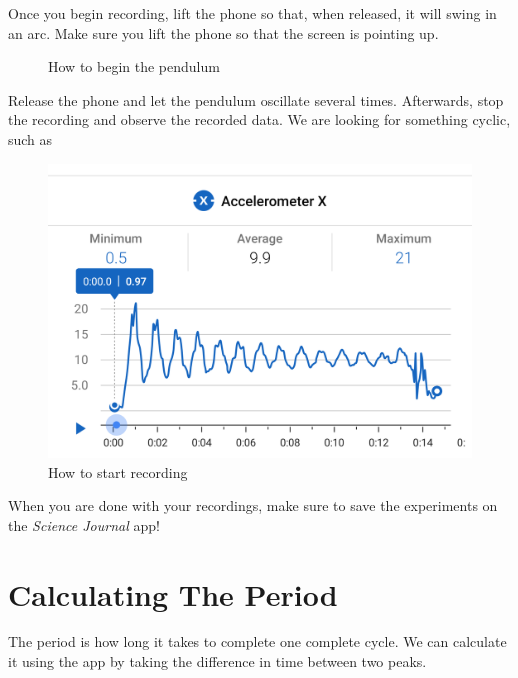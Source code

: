 \documentclass[a4paper]{article}
\begin{document}
Once you begin recording, lift the phone so that, when released, it will swing in an arc. Make sure you lift the phone so that the screen is pointing up.

\begin{figure}[H]
    \centering
    \caption{How to begin the pendulum}
    \label{fig:my_label}
\end{figure}

Release the phone and let the pendulum oscillate several times. Afterwards, stop the recording and observe the recorded data. We are looking for something cyclic, such as 

\begin{figure}[H]
    \centering
    \includegraphics[scale=0.2]{graph.png}
    \caption{How to start recording}
    \label{fig:my_label}
\end{figure}

When you are done with your recordings, make sure to save the experiments on the 
\textit{Science Journal} app!

\section{Calculating The Period}

The period is how long it takes to complete one complete cycle. We can calculate it using the app by taking the difference in time between two peaks.
\end{document}
